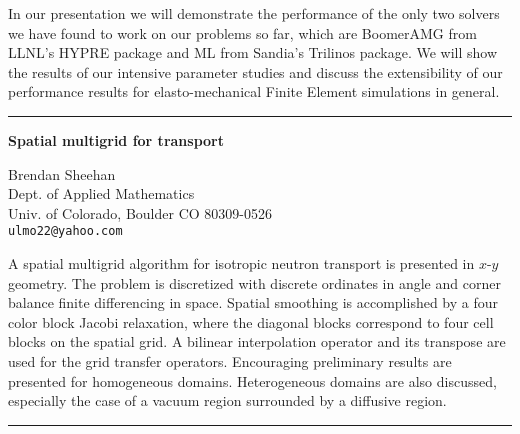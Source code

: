 \documentclass[twosided]{report}
\begin{document}
In our
presentation we will demonstrate the performance of the only
two solvers we have found to work on our problems so far,
which are BoomerAMG from LLNL's HYPRE package and ML from
Sandia's Trilinos package. We will show the results of our
intensive parameter studies and discuss the extensibility of
our performance results for elasto-mechanical Finite Element
simulations in general.



	\begin{center} \rule{6in}{1pt} \end{center}

\begin{center}
{\large			%
{\bf Spatial multigrid for transport}}

	Brendan Sheehan \\
	Dept. of Applied Mathematics \\
	Univ. of Colorado, Boulder CO 80309-0526 \\
	{\tt ulmo22@yahoo.com}
\end{center}
A spatial multigrid algorithm for isotropic neutron
transport is presented in $x$-$y$ geometry. The problem is
discretized with discrete ordinates in angle and corner
balance finite differencing in space. Spatial smoothing is
accomplished by a four color block Jacobi relaxation, where
the diagonal blocks correspond to four cell blocks on the
spatial grid. A bilinear interpolation operator and its
transpose are used for the grid transfer operators.
Encouraging preliminary results are presented for
homogeneous domains. Heterogeneous domains are also
discussed, especially the case of a vacuum region surrounded
by a diffusive region.



	\begin{center} \rule{6in}{1pt} \end{center}
\end{document}
